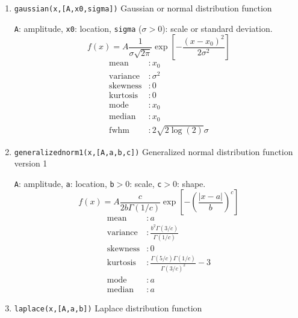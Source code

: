 \documentclass[reprint,showpacs,prb,nofootinbib,amsmath,amssymb]{revtex4-1}
\begin{document}
\begin{enumerate}
\item \verb|gaussian(x,[A,x0,sigma])| Gaussian or normal distribution function

\verb|A|: amplitude, \verb|x0|: location, \verb|sigma| ($\sigma>0$): scale or standard deviation.
\begin{equation}
f(x) = A\frac{1}{\sigma\sqrt{2\pi}}\exp\left[-\frac{(x-x_0)^2}{2\sigma^2}\right] \nonumber
\end{equation}
\begin{align}
	\mbox{mean} 		&: \mbox{$x_0$} \nonumber \\
	\mbox{variance}		&: \mbox{$\sigma^2$} \nonumber \\
	\mbox{skewness}     &: \mbox{$0$} \nonumber \\
	\mbox{kurtosis}     &: \mbox{$0$}  \nonumber \\
	\mbox{mode}      	&: \mbox{$x_0$}  \nonumber \\
	\mbox{median}       &: \mbox{$x_0$}  \nonumber \\
	\mbox{fwhm} 		&: \mbox{$2\sqrt{2\log(2)}\sigma$}  \nonumber
\end{align}

\item \verb|generalizednorm1(x,[A,a,b,c])| Generalized normal distribution function version 1~\cite{generalizednorm1}

\verb|A|: amplitude, \verb|a|: location, \verb|b|$>0$: scale, \verb|c|$>0$: shape. 
\begin{equation}
f(x)=A\frac{c}{2b\Gamma(1/c)}\exp\left[-\left(\frac{\left|x-a\right|}{b}\right)^c\right] \nonumber
\end{equation}
\begin{align}
	\mbox{mean} 		&: \mbox{$a$} \nonumber \\
	\mbox{variance}		&: \mbox{$\frac{b^2\Gamma(3/c)}{\Gamma(1/c)}$} \nonumber \\
	\mbox{skewness}     &: \mbox{$0$} \nonumber \\
	\mbox{kurtosis}     &: \mbox{$\frac{\Gamma(5/c)\Gamma(1/c)}{\Gamma(3/c)^2}-3$}  \nonumber \\
	\mbox{mode}      	&: \mbox{$a$}  \nonumber \\
	\mbox{median}       &: \mbox{$a$}  \nonumber
\end{align}

\item \verb|laplace(x,[A,a,b])| Laplace distribution function~\cite{McLaughlin}


\end{enumerate}
\end{document}
